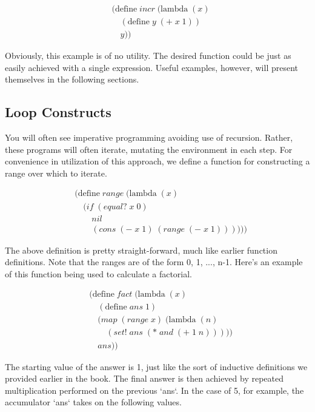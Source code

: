 \begin{align*}
& (\text{define} \; incr \; (\text{lambda} \; (x)
\\& \quad (\text{define} \; y \; (+ \; x \; 1))
\\& \quad y))
\end{align*}

Obviously, this example is of no utility. The desired function could be just as 
easily achieved with a single expression. Useful examples, however, will present 
themselves in the following sections.

\subsection{Loop Constructs}
You will often see imperative programming avoiding use of recursion. Rather, these 
programs will often iterate, mutating the environment in each step. For convenience 
in utilization of this approach, we define a function for constructing a range over 
which to iterate.

\begin{align*}
& (\text{define} \; range \; (\text{lambda} \; (x)
\\& \quad (if \; (equal? \; x \; 0)
\\& \qquad nil
\\& \qquad (cons \; (- \; x \; 1) \; (range \; (- \; x \; 1))))))
\end{align*}

The above definition is pretty straight-forward, much like earlier function 
definitions. Note that the ranges are of the form 0, 1, ..., n-1. Here's an example 
of this function being used to calculate a factorial.

\begin{align*}
& (\text{define} \; fact \; (\text{lambda} \; (x)
\\& \quad (\text{define} \; ans \; 1)
\\& \quad (map \; (range \; x) \; (\text{lambda} \; (n)
\\& \qquad (set! \; ans \; (* \; and \; (+ \; 1 \; n)))))
\\& \quad ans))
\end{align*}

The starting value of the answer is 1, just like the sort of inductive definitions we 
provided earlier in the book. The final answer is then achieved by repeated 
multiplication performed on the previous `ans`. In the case of 5, for example, the 
accumulator `ans` takes on the following values.

